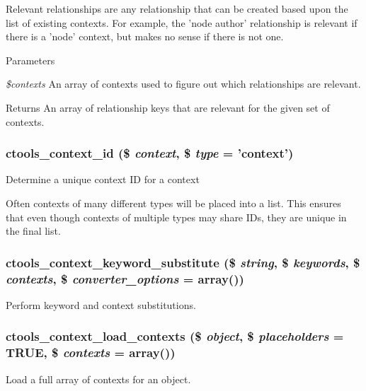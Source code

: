 Relevant relationships are any relationship that can be created based upon the list of existing contexts. For example, the 'node author' relationship is relevant if there is a 'node' context, but makes no sense if there is not one.


\begin{DoxyParams}{Parameters}
\item[{\em \$contexts}]An array of contexts used to figure out which relationships are relevant.\end{DoxyParams}
\begin{DoxyReturn}{Returns}
An array of relationship keys that are relevant for the given set of contexts. 
\end{DoxyReturn}
\hypertarget{context_8inc_aa9c13b6311b3d3a54e95a440bb3b0002}{
\subsubsection[{ctools\_\-context\_\-id}]{\setlength{\rightskip}{0pt plus 5cm}ctools\_\-context\_\-id (\$ {\em context}, \/  \$ {\em type} = {\ttfamily 'context'})}}
\label{context_8inc_aa9c13b6311b3d3a54e95a440bb3b0002}
Determine a unique context ID for a context

Often contexts of many different types will be placed into a list. This ensures that even though contexts of multiple types may share IDs, they are unique in the final list. \hypertarget{context_8inc_a713ff6a51980f56ba1d148ef7c3640ab}{
\subsubsection[{ctools\_\-context\_\-keyword\_\-substitute}]{\setlength{\rightskip}{0pt plus 5cm}ctools\_\-context\_\-keyword\_\-substitute (\$ {\em string}, \/  \$ {\em keywords}, \/  \$ {\em contexts}, \/  \$ {\em converter\_\-options} = {\ttfamily array()})}}
\label{context_8inc_a713ff6a51980f56ba1d148ef7c3640ab}
Perform keyword and context substitutions. \hypertarget{context_8inc_a390479c5cf52f6391de6bca71efe44df}{
\subsubsection[{ctools\_\-context\_\-load\_\-contexts}]{\setlength{\rightskip}{0pt plus 5cm}ctools\_\-context\_\-load\_\-contexts (\$ {\em object}, \/  \$ {\em placeholders} = {\ttfamily TRUE}, \/  \$ {\em contexts} = {\ttfamily array()})}}
\label{context_8inc_a390479c5cf52f6391de6bca71efe44df}
Load a full array of contexts for an object.

